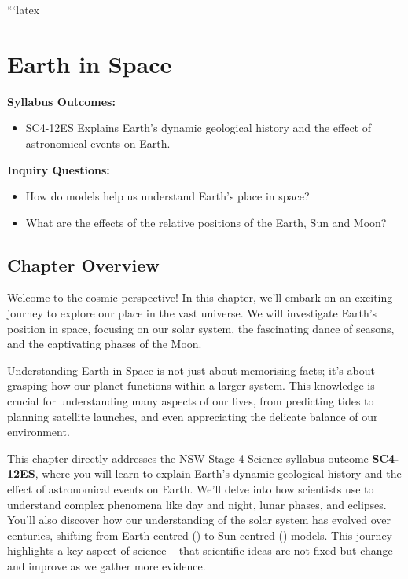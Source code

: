 ```latex
\chapter{Earth in Space}

\begin{marginnote}
\textbf{Syllabus Outcomes:}
\begin{itemize}
    \item SC4-12ES Explains Earth’s dynamic geological history and the effect of astronomical events on Earth.
\end{itemize}
\textbf{Inquiry Questions:}
\begin{itemize}
    \item How do models help us understand Earth’s place in space?
    \item What are the effects of the relative positions of the Earth, Sun and Moon?
\end{itemize}
\end{marginnote}

\section*{\centering Chapter Overview}

Welcome to the cosmic perspective! In this chapter, we'll embark on an exciting journey to explore our place in the vast universe. We will investigate Earth’s position in space, focusing on our solar system, the fascinating dance of seasons, and the captivating phases of the Moon.

Understanding Earth in Space is not just about memorising facts; it’s about grasping how our planet functions within a larger system.  This knowledge is crucial for understanding many aspects of our lives, from predicting tides to planning satellite launches, and even appreciating the delicate balance of our environment.

This chapter directly addresses the NSW Stage 4 Science syllabus outcome \textbf{SC4-12ES}, where you will learn to explain Earth’s dynamic geological history and the effect of astronomical events on Earth. We’ll delve into how scientists use  to understand complex phenomena like day and night, lunar phases, and eclipses.  You’ll also discover how our understanding of the solar system has evolved over centuries, shifting from Earth-centred () to Sun-centred () models. This journey highlights a key aspect of science – that scientific ideas are not fixed but change and improve as we gather more evidence.

